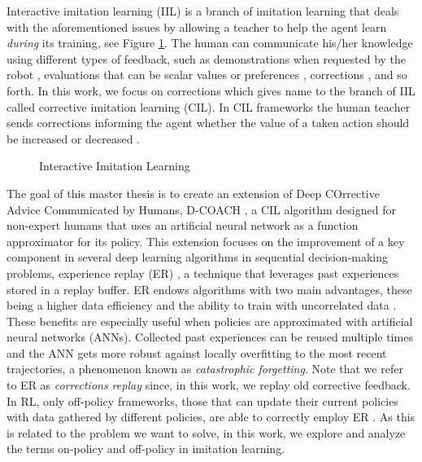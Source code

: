Interactive imitation learning (IIL) is a branch of imitation learning \cite{lazydagger:2021} that deals with the aforementioned issues by allowing a teacher to help the agent learn \textit{during} its training, see Figure \ref{fig:IIL}. The human can communicate his/her knowledge using different types of feedback, such as demonstrations when requested by the robot \cite{demonstration-robot-query}, evaluations that can be scalar values \cite{TAMER-Knox-Stone:2009} or preferences \cite{learning-from-human-preferences:2018}, corrections \cite{COACH-Celemin-Ruiz-del-Solar:2015}, and so forth. In this work, we focus on corrections which gives name to the branch of IIL called corrective imitation learning (CIL). In CIL frameworks the human teacher sends corrections informing the agent whether the value of a taken action should be increased or decreased \cite{Relative-corrections-Celemin:2019}.








\begin{figure}[H]
    \centering
    \caption{Interactive Imitation Learning}
    \label{fig:IIL}
\end{figure}




The goal of this master thesis is to create an extension of Deep COrrective Advice Communicated by Humans, D-COACH \cite{D-COACH-Dattari-Celemin-Ruiz-del-Solar-Kober:2018}, a CIL algorithm designed for non-expert humans that uses an artificial neural network as a function approximator for its policy. This extension focuses on the improvement of a key component in several deep learning algorithms in sequential decision-making problems, experience replay (ER) \cite{Atari-RL}, a technique that leverages past experiences stored in a replay buffer. ER endows algorithms with two main advantages, these being a higher data efficiency and the ability to train with uncorrelated data \cite{Experience-Replay-zhang:2018}. These benefits are especially useful when policies are approximated with artificial neural networks (ANNs). Collected past experiences can be reused multiple times and the ANN gets more robust against locally overfitting to the most recent trajectories, a phenomenon known as \textit{catastrophic forgetting}. Note that we refer to ER as \textit{corrections replay} since, in this work, we replay old corrective feedback. In RL, only off-policy frameworks, those that can update their current policies with data gathered by different policies, are able to correctly employ ER \cite{Atari-RL}. As this is related to the problem we want to solve, in this work, we explore and analyze the terms on-policy and off-policy in imitation learning.




